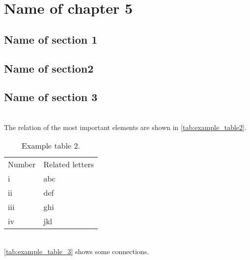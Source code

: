 \documentclass[../main.tex]{subfiles}
\begin{document}
    \chapter{Name of chapter 5}
    \lipsum[1]
    \section{Name of section 1}
    \lipsum[1]
    
    \section{Name of section2}
    \lipsum[1]
    
    \section{Name of section 3}\label{subsec_stpa_sec}
    \lipsum[1]\\
    The relation of the most important elements are shown in \autoref{tab:example_table2}.
    
    \begin{table}[H]
        \small
        \caption{Example table 2.}
        \label{tab:example_table2}
        \centering
        \renewcommand{\arraystretch}{1.5}
        \begin{tabular}{l|l}
        \cellcolor{gray!25}Number & \cellcolor{gray!25}Related letters \\
        \Xhline{2\arrayrulewidth}
            i & abc\\
            \hline
            ii & def\\
            \hline
            iii & ghi\\
            \hline
            iv & jkl\\
            \hline
        \end{tabular}
        \renewcommand{\arraystretch}{1}
    \end{table}
    
    \lipsum[1]\\
    \autoref{tab:example_table_3} shows some connections.
    
\end{document}
